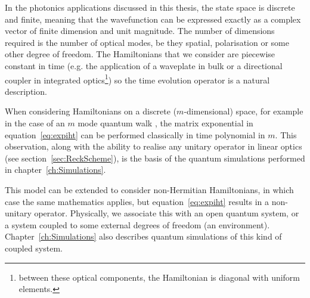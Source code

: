 In the photonics applications discussed in this thesis,
the state space is discrete and finite, meaning that the wavefunction
can be expressed exactly as a complex vector of finite dimension and unit
magnitude. The number of
dimensions required is the number of optical modes, be they spatial,
polarisation or some other degree of freedom. The Hamiltonians that we consider
are piecewise constant in time (e.g. the application of a waveplate in bulk or
a directional coupler in integrated optics\footnote{between these optical
components, the Hamiltonian is diagonal with uniform elements.}) so the time
evolution operator is a natural description.

When considering Hamiltonians on a discrete (\(m\)-dimensional) space, for
example in the case of an \(m\) mode quantum walk \cite{walks-peruzzo}, the
matrix exponential in equation~\ref{eq:expiht} can be performed classically in
time polynomial in \(m\). This observation, along with the ability to realise
any unitary operator in linear optics (see section~\ref{sec:ReckScheme}), is the
basis of the quantum simulations performed in chapter~\ref{ch:Simulations}.

This model can be extended to consider non-Hermitian Hamiltonians, in which
case the same mathematics applies, but equation~\ref{eq:expiht} results in a 
non-unitary operator. Physically, we associate this with an open quantum system,
or a system coupled to some external degrees of freedom (an environment).
Chapter~\ref{ch:Simulations} also describes quantum simulations of this kind of
coupled system.

